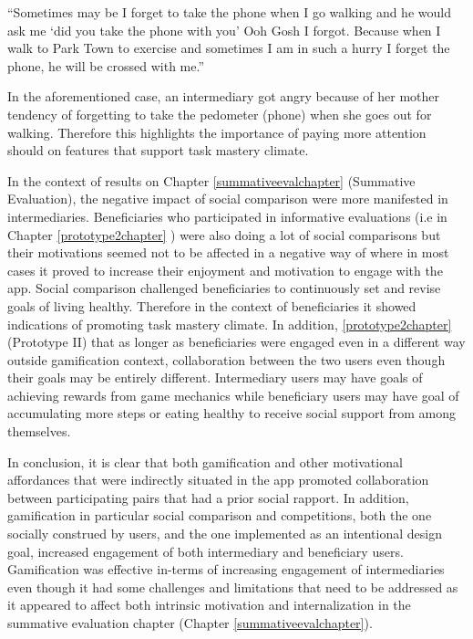  {``Sometimes may be I forget to take the phone when I go walking and he would ask me `did you take the phone with you' Ooh Gosh I forgot.  Because when I walk to Park Town to exercise and sometimes  I am in such a hurry I forget the phone, he will be crossed with me.''} 

In the aforementioned case, an intermediary got angry because of her mother tendency of forgetting to take the pedometer (phone) when she goes out for walking. Therefore this highlights the importance of paying more attention should on features that support task mastery climate. 

In the context of results on Chapter \ref{summativeevalchapter} (Summative Evaluation), the negative impact of social comparison were more manifested in intermediaries. Beneficiaries who participated in informative evaluations (i.e in Chapter \ref{prototype2chapter} ) were also doing a lot of social comparisons but their motivations seemed not to be affected in a negative way of where in most cases it proved to increase their enjoyment and motivation to engage with the app. Social comparison challenged beneficiaries to continuously set and revise goals of living healthy. Therefore in the context of beneficiaries it showed indications of promoting task mastery climate.  In addition,  \ref{prototype2chapter} (Prototype II) that as longer as beneficiaries were engaged even in a different way outside gamification context, collaboration between the two users even though their goals may be entirely different. Intermediary users may have goals of achieving rewards from game mechanics while beneficiary users may have goal of accumulating more steps or eating healthy to receive social support from among themselves.

In conclusion, it is clear that both gamification and other motivational affordances that were indirectly situated in the app promoted collaboration between participating pairs that had a prior social rapport. In addition, gamification in particular social comparison and competitions, both the one socially construed by users, and the one implemented as an intentional design goal, increased engagement of both intermediary and beneficiary users.
Gamification was effective in-terms of increasing engagement of intermediaries even though it had some challenges and limitations that need to be addressed as it appeared to affect both intrinsic motivation and internalization in the summative evaluation chapter (Chapter \ref{summativeevalchapter}). 

